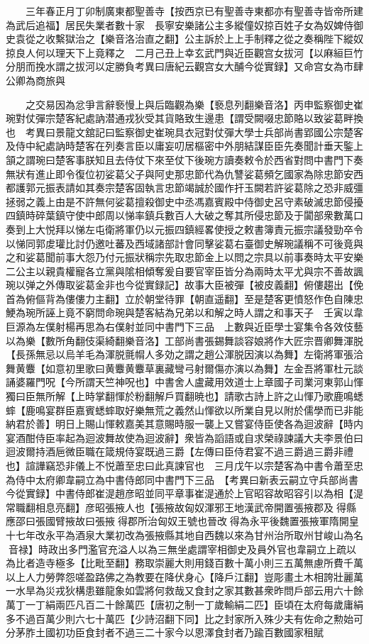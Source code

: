 　　三年春正月丁卯制廣東都聖善寺【按西京已有聖善寺東都亦有聖善寺皆帝所建為武后追福】居民失業者數十家　長寧安樂諸公主多縱僮奴掠百姓子女為奴婢侍御史袁從之收繫獄治之【樂音洛治直之翻】公主訴於上上手制釋之從之奏稱陛下縱奴掠良人何以理天下上竟釋之　二月己丑上幸玄武門與近臣觀宫女拔河【以麻絙巨竹分朋而挽水謂之拔河以定勝負考異曰唐紀云觀宫女大酺今從實録】又命宫女為市肆公卿為商旅與

　　之交易因為忿爭言辭䙝慢上與后臨觀為樂【䙝息列翻樂音洛】丙申監察御史崔琬對仗彈宗楚客紀處訥潜通戎狄受其貨賂致生邊患【謂受闕啜忠節賂以致娑葛畔換也　考異曰景龍文舘記曰監察御史崔琬具衣冠對仗彈大學士兵部尚書郢國公宗楚客及侍中紀處訥時楚客在列奏言臣以庸妄叨居樞密中外朋結謀臣臣先奏聞計垂天鍳上頷之謂琬曰楚客事朕知且去侍仗下來至仗下後琬方讀奏敕令於西省對問中書門下奏無狀有進止即令復位初娑葛父子與阿史那忠節代為仇讐娑葛頻乞國家為除忠節安西都護郭元振表請如其奏宗楚客固執言忠節竭誠於國作扞玉闕若許娑葛除之恐非威彊拯弱之義上由是不許無何娑葛擅殺御史中丞馮嘉賓殿中侍御史呂守素破滅忠節侵擾四鎮時碎葉鎮守使中郎周以悌率鎮兵數百人大破之奪其所侵忠節及于闐部衆數萬口奏到上大悦拜以悌左屯衛將軍仍以元振四鎮經畧使授之敕書簿責元振宗議發勁卒令以悌同郭䖍瓘比討仍邀吐蕃及西域諸部計會同擊娑葛右臺御史解琬議稱不可後竟與之和娑葛聞前事大怨乃付元振狀稱宗先取忠節金上以問之宗具以前事奏時太平安樂二公主以親貴權寵各立黨與隂相傾奪爰自要官宰臣皆分為兩時太平尤與宗不善故諷琬以弹之外傳取娑葛金非也今從實録記】故事大臣被彈【被皮義翻】俯僂趨出【俛首為俯傴背為僂僂力主翻】立於朝堂待罪【朝直遥翻】至是楚客更憤怒作色自陳忠鯁為琬所誣上竟不窮問命琬與楚客結為兄弟以和解之時人謂之和事天子　壬寅以韋巨源為左僕射楊再思為右僕射並同中書門下三品　上數與近臣學士宴集令各效伎藝以為樂【數所角翻伎渠綺翻樂音洛】工部尚書張錫舞談容娘將作大匠宗晋卿舞渾脱【長孫無忌以烏羊毛為渾脱氈㡌人多効之謂之趙公渾脱因演以為舞】左衛將軍張洽舞黄麞【如意初里歌曰黄麞黄麞草裏藏彎弓射爾傷亦演以為舞】左金吾將軍杜元談誦婆羅門呪【今所謂天竺神呪也】中書舍人盧藏用效道士上章國子司業河東郭山惲獨曰臣無所解【上時掌翻惲於粉翻解戶買翻暁也】請歌古詩上許之山惲乃歌鹿鳴蟋蟀【鹿鳴宴群臣嘉賓蟋蟀取好樂無荒之義然山惲欲以所業自見以附於儒學而已非能納君於善】明日上賜山惲敕嘉美其意賜時服一襲上又嘗宴侍臣使各為迴波辭【時内宴酒酣侍臣率起為迴波舞故使為迴波辭】衆皆為謟語或自求榮祿諫議大夫李景伯曰迴波爾持酒巵微臣職在箴規侍宴既過三爵【左傳曰臣侍君宴不過三爵過三爵非禮也】諠譁竊恐非儀上不悦蕭至忠曰此真諫官也　三月戊午以宗楚客為中書令蕭至忠為侍中太府卿韋嗣立為中書侍郎同中書門下三品　【考異曰新表云嗣立守兵部尚書今從實録】中書侍郎崔湜趙彦昭並同平章事崔湜通於上官昭容故昭容引以為相【湜常職翻相息亮翻】彦昭張掖人也【張掖故匈奴渾邪王地漢武帝開置張掖郡及得縣應邵曰張國臂掖故曰張掖得郡所治匈奴王號也晉改得為永平後魏置張掖軍隋開皇十七年改永平為酒泉大業初改為張掖縣其地自西魏以來為甘州治所取州甘峻山為名音禄】時政出多門濫官充溢人以為三無坐處謂宰相御史及員外官也韋嗣立上疏以為比者造寺極多【比毗至翻】務取崇麗大則用錢百數十萬小則三五萬無慮所費千萬以上人力勞弊怨嗟盈路佛之為教要在降伏身心【降戶江翻】豈彫畫土木相誇壯麗萬一水旱為災戎狄構患雖龍象如雲將何救哉又食封之家其數甚衆昨問戶部云用六十餘萬丁一丁絹兩匹凡百二十餘萬匹【唐初之制一丁歲輸絹二匹】臣頃在太府每歲庸絹多不過百萬少則六七十萬匹【少詩沼翻下同】比之封家所入殊少夫有佐命之勲始可分茅胙土國初功臣食封者不過三二十家今以恩澤食封者乃踰百數國家租賦